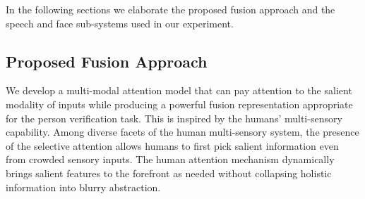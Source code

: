 \documentclass{article}
\begin{document}

In the following sections we elaborate the proposed fusion approach and the speech and face sub-systems used in our experiment. 

\subsection{Proposed Fusion Approach}
We develop a multi-modal attention model that can pay attention to the salient modality of inputs while producing a powerful fusion representation appropriate for the person verification task.
This is inspired by the humans' multi-sensory capability. Among diverse facets of the human multi-sensory system, the presence of the selective attention \cite{corbetta2002control} allows humans to first pick salient information even from crowded sensory inputs.
The human attention mechanism dynamically brings salient features to the forefront as needed without collapsing holistic information into blurry abstraction.
\end{document}
